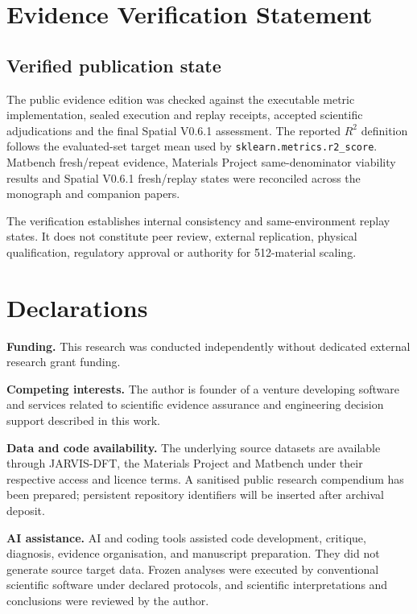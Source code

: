 \documentclass[11pt,a4paper,oneside]{report}
\begin{document}
\chapter{Evidence Verification Statement}
\section{Verified publication state}
The public evidence edition was checked against the executable metric implementation,
sealed execution and replay receipts, accepted scientific adjudications and the final
Spatial V0.6.1 assessment. The reported $R^2$ definition follows the evaluated-set
target mean used by \texttt{sklearn.metrics.r2\_score}. Matbench fresh/repeat evidence,
Materials Project same-denominator viability results and Spatial V0.6.1 fresh/replay
states were reconciled across the monograph and companion papers.

The verification establishes internal consistency and same-environment replay states.
It does not constitute peer review, external replication, physical qualification,
regulatory approval or authority for 512-material scaling.


\chapter*{Declarations}

\textbf{Funding.} This research was conducted independently without dedicated external research grant funding.

\textbf{Competing interests.} The author is founder of a venture developing software and services related to scientific evidence assurance and engineering decision support described in this work.

\textbf{Data and code availability.} The underlying source datasets are available through JARVIS-DFT, the Materials Project and Matbench under their respective access and licence terms. A sanitised public research compendium has been prepared; persistent repository identifiers will be inserted after archival deposit.

\textbf{AI assistance.} AI and coding tools assisted code development, critique, diagnosis, evidence organisation, and manuscript preparation. They did not generate source target data. Frozen analyses were executed by conventional scientific software under declared protocols, and scientific interpretations and conclusions were reviewed by the author.
\end{document}
